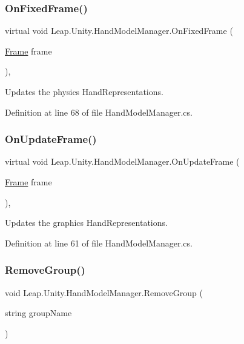 \subsubsection{\texorpdfstring{OnFixedFrame()}{OnFixedFrame()}}
{\footnotesize\ttfamily virtual void Leap.\+Unity.\+Hand\+Model\+Manager.\+On\+Fixed\+Frame (\begin{DoxyParamCaption}\item[{\mbox{\hyperlink{class_leap_1_1_frame}{Frame}}}]{frame }\end{DoxyParamCaption})\hspace{0.3cm}{\ttfamily [protected]}, {\ttfamily [virtual]}}

Updates the physics Hand\+Representations. 

Definition at line 68 of file Hand\+Model\+Manager.\+cs.

\mbox{\label{class_leap_1_1_unity_1_1_hand_model_manager_ad446a51a6956db5c0e30dd4c96981180}} 
\subsubsection{\texorpdfstring{OnUpdateFrame()}{OnUpdateFrame()}}
{\footnotesize\ttfamily virtual void Leap.\+Unity.\+Hand\+Model\+Manager.\+On\+Update\+Frame (\begin{DoxyParamCaption}\item[{\mbox{\hyperlink{class_leap_1_1_frame}{Frame}}}]{frame }\end{DoxyParamCaption})\hspace{0.3cm}{\ttfamily [protected]}, {\ttfamily [virtual]}}

Updates the graphics Hand\+Representations. 

Definition at line 61 of file Hand\+Model\+Manager.\+cs.

\mbox{\label{class_leap_1_1_unity_1_1_hand_model_manager_aa85896c2f7d1b17021f0fb1d3a1086c2}} 
\subsubsection{\texorpdfstring{RemoveGroup()}{RemoveGroup()}}
{\footnotesize\ttfamily void Leap.\+Unity.\+Hand\+Model\+Manager.\+Remove\+Group (\begin{DoxyParamCaption}\item[{string}]{group\+Name }\end{DoxyParamCaption})}



